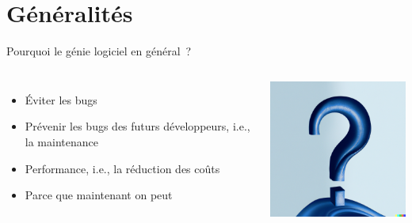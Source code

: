 \documentclass{beamer}
\begin{document}
    \section{Généralités}\label{sec:generalites}
    \begin{frame}{Pourquoi le génie logiciel en général~?}
        \begin{columns}
            \begin{itemize}

                \item Éviter les bugs
                \item Prévenir les bugs des futurs développeurs, i.e., la maintenance
                \item Performance, i.e., la réduction des coûts
                \item Parce que maintenant on peut
            \end{itemize}
            \centering
            \centering
            \includegraphics[width=6.0cm]{image/question-mark-on-a-blank-background}
        \end{columns}
    \end{frame}
\end{document}

